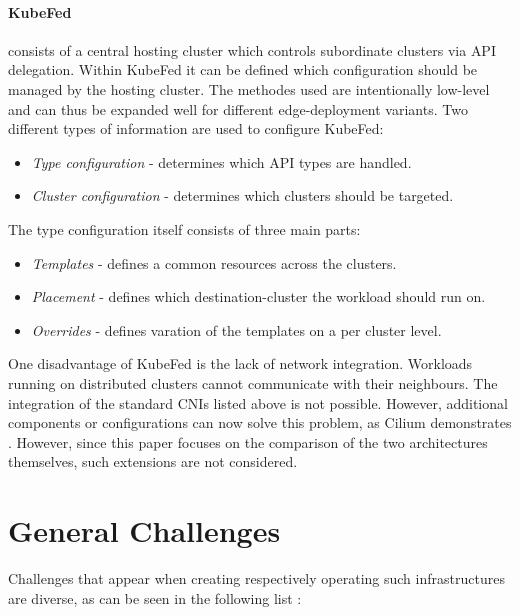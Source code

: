 \documentclass[MIC,Master,english]{twbook}%
\begin{document}
\paragraph{\ac{KubeFed}} consists of a central hosting cluster which controls subordinate clusters via \ac{API} delegation. Within \ac{KubeFed} it can be defined which configuration should be managed by the hosting cluster. The methodes used are intentionally low-level and can thus be expanded well for different edge-deployment variants. Two different types of information are used to configure \ac{KubeFed}\cite{kubefed-github}:

\begin{itemize}
    \item \textit{Type configuration} - determines which \ac{API} types are handled.
    \item \textit{Cluster configuration} - determines which clusters should be targeted.
\end{itemize}

The type configuration itself consists of three main parts:

\begin{itemize}
    \item \textit{Templates} - defines a common resources across the clusters.
    \item \textit{Placement} - defines which destination-cluster the workload should run on.
    \item \textit{Overrides} - defines varation of the templates on a per cluster level.
\end{itemize}

One disadvantage of KubeFed is the lack of network integration. Workloads running on distributed clusters cannot communicate with their neighbours. The integration of the standard CNIs listed above is not possible. However, additional components or configurations can now solve this problem, as Cilium demonstrates \cite{ciliummesh}. However, since this paper focuses on the comparison of the two architectures themselves, such extensions are not considered.

\section{General Challenges} 
\label{sec:generalchallanges}
Challenges that appear when creating respectively operating such infrastructures are diverse, as can be seen in the following list \cite{intro-edge}:
\end{document}

